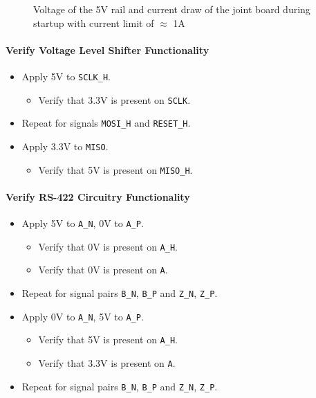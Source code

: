 \begin{figure}[h]
	\centering
	
	\caption{Voltage of the 5V rail and current draw of the joint board during startup with current limit of $\approx$ 1A}
	\label{fig:joint_no_curr_limit}
\end{figure}

\paragraph{Verify Voltage Level Shifter Functionality} %
\label{par:verify_voltage_level_shifter_functionality}
\begin{itemize}
	\item Apply 5V to \texttt{SCLK\_H}.
	\begin{itemize}
		\item[\cmark]  Verify that 3.3V is present on \texttt{SCLK}.
	\end{itemize}
	\item Repeat for signals \texttt{MOSI\_H} and \texttt{RESET\_H}.
	\item Apply 3.3V to \texttt{MISO}.
	\begin{itemize}
		\item[\cmark]  Verify that 5V is present on \texttt{MISO\_H}.
	\end{itemize}
\end{itemize}

\paragraph{Verify RS-422 Circuitry Functionality} %
\label{par:verify_rs_422_circuitry_functionality}
\begin{itemize}
	\item Apply 5V to \texttt{A\_N}, 0V to \texttt{A\_P}.
	\begin{itemize}
		\item[\cmark] Verify that 0V is present on \texttt{A\_H}.
		\item[\cmark] Verify that 0V is present on \texttt{A}.
	\end{itemize}
	\item Repeat for signal pairs \texttt{B\_N}, \texttt{B\_P} and \texttt{Z\_N}, \texttt{Z\_P}.
	\item Apply 0V to \texttt{A\_N}, 5V to \texttt{A\_P}.
	\begin{itemize}
		\item[\cmark] Verify that 5V is present on \texttt{A\_H}.
		\item[\cmark] Verify that 3.3V is present on \texttt{A}.
	\end{itemize}
	\item Repeat for signal pairs \texttt{B\_N}, \texttt{B\_P} and \texttt{Z\_N}, \texttt{Z\_P}.
\end{itemize}
